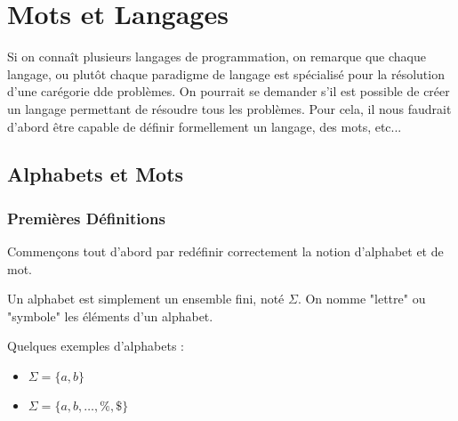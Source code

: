 \chapter{Mots et Langages}

\minitoc %

\justify

\setlength{\parindent}{0pt}
\renewcommand{\labelitemi}{\textbullet} %


Si on connaît plusieurs langages de programmation, on remarque que chaque langage, ou plutôt chaque paradigme de 
langage est spécialisé pour la résolution d'une carégorie dde problèmes. 
On pourrait se demander s'il est possible de créer un langage permettant de résoudre tous les problèmes. 
Pour cela, il nous faudrait d'abord être capable de définir formellement un langage, des mots, etc... 


\section{Alphabets et Mots}

\subsection{Premières Définitions}

Commençons tout d'abord par redéfinir correctement la notion d'alphabet et de mot. 

\begin{definition}[Alphabet]
    Un alphabet est simplement un ensemble fini, noté $\Sigma$.
    On nomme "lettre" ou "symbole" les éléments d'un alphabet.  
\end{definition}

\begin{example}
    Quelques exemples d'alphabets :
    \begin{itemize}
        \item $\Sigma = \{a,b\}$ 
        \item $\Sigma = \{a,b,\dots,\text{\%},\text{\$}\}$
    \end{itemize}
\end{example}

